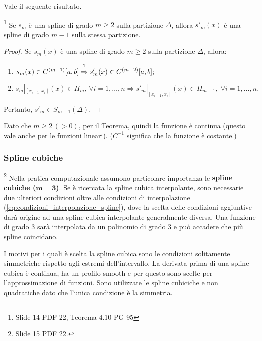 \noindent Vale il seguente risultato.

\begin{theorem}\label{th:grado_derivata_spline}
    \footnote{Slide 14 PDF 22, Teorema 4.10 PG 95} Se $s_m$ è una spline di grado $m\geq 2$ sulla partizione $\Delta$, allora $s'_m(x)$ è una spline di grado $m-1$ sulla stessa partizione.
\end{theorem}
\begin{proof}
    Se $s_m(x)$ è una spline di grado $m\geq 2$ sulla partizione $\Delta$, allora:
    \begin{enumerate}
        \item $s_m(x)\in C^{(m-1)}[a,b]\overset{\footnotemark}{\Rightarrow} s'_m(x)\in C^{(m-2)}[a,b];$
        \item $s_m|_{[x_{i-1},x_i]}(x)\in\Pi_m,\,\forall i=1,\hdots,n\Rightarrow s'_m|_{[x_{i-1},x_i]}(x)\in\Pi_{m-1},\;\forall i=1,\hdots,n.$
    \end{enumerate}
    Pertanto, $s'_m\in S_{m-1}(\Delta).$
\end{proof}
Dato che $m\geq 2\,(>0)$, per il Teorema, quindi la funzione è continua (questo vale anche per le funzioni lineari). ($C^{-1}$ significa che la funzione è costante.)

\subsubsection{Spline cubiche}
\begin{remark}
    \footnote{Slide 15 PDF 22.}
    Nella pratica computazionale assumono particolare importanza le \textbf{spline cubiche ($\boldsymbol{m=3}$)}. Se è ricercata la spline cubica interpolante, sono necessarie due ulteriori condizioni oltre alle condizioni di interpolazione (\ref{eq:condizioni_interpolazione_spline}), dove la scelta delle condizioni aggiuntive darà origine ad una spline cubica interpolante generalmente diversa. Una funzione di grado 3 sarà interpolata da un polinomio di grado 3 e può accadere che più spline coincidano.
\end{remark}

I motivi per i quali è scelta la spline cubica sono le condizioni solitamente simmetriche rispetto agli estremi dell'intervallo. La derivata prima di una spline cubica è continua, ha un profilo smooth e per questo sono scelte per l'approssimazione di funzioni. Sono utilizzate le spline cubiciche e non quadratiche dato che l'unica condizione è la simmetria.

